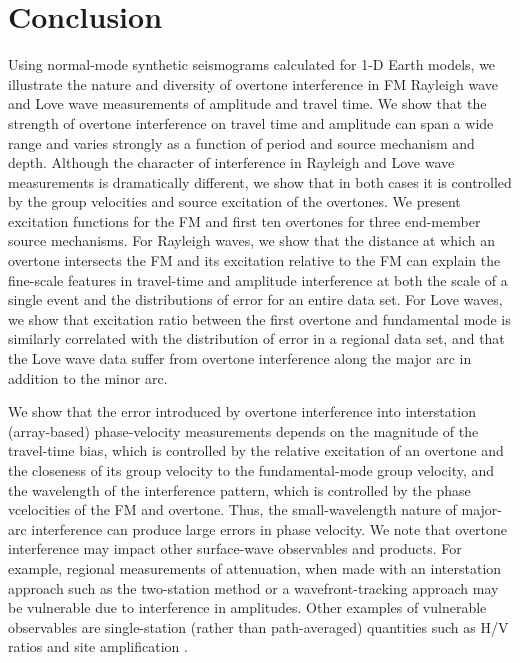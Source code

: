 \documentclass[extra,mreferee]{gji}
\begin{document}
\section{Conclusion}
Using normal-mode synthetic seismograms calculated for 1-D Earth models, we illustrate the nature and diversity of overtone interference in FM Rayleigh wave and Love wave measurements of amplitude and travel time. We show that the strength of overtone interference on travel time and amplitude can span a wide range and varies strongly as a function of period and source mechanism and depth. Although the character of interference in Rayleigh and Love wave measurements is dramatically different, we show that in both cases it is controlled by the group velocities and source excitation of the overtones. We present excitation functions for the FM and first ten overtones for three end-member source mechanisms. For Rayleigh waves, we show that the distance at which an overtone intersects the FM and its excitation relative to the FM can explain the fine-scale features in travel-time and amplitude interference at both the scale of a single event and the distributions of error for an entire data set. For Love waves, we show that excitation ratio between the first overtone and fundamental mode is similarly correlated with the distribution of error in a regional data set, and that the Love wave data suffer from overtone interference along the major arc in addition to the minor arc.

We show that the error introduced by overtone interference into interstation (array-based) phase-velocity measurements depends on the magnitude of the travel-time bias, which is controlled by the relative excitation of an overtone and the closeness of its group velocity to the fundamental-mode group velocity, and the wavelength of the interference pattern, which is controlled by the phase vcelocities of the FM and overtone. Thus, the small-wavelength nature of major-arc interference can produce large errors in phase velocity. We note that overtone interference may impact other surface-wave observables and products. For example, regional measurements of attenuation, when made with an interstation approach such as the two-station method \citep{zhou2020rayleigh} or a wavefront-tracking approach \citep{xbaoattenuationsurfacewaves} may be vulnerable due to interference in amplitudes. Other examples of vulnerable observables are single-station (rather than path-averaged) quantities such as H/V ratios \citep{tanimoto2008zh} and site amplification \citep{eddy2014local,schardong2019anatomy}. 
\end{document}
